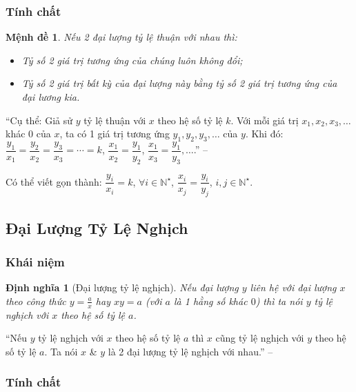 \documentclass{article}
\numberwithin{equation}{section}
\newtheorem{dinhnghia}{Định nghĩa}[section]
\newtheorem{menhde}{Mệnh đề}[section]
\begin{document}
\subsubsection{Tính chất}

\begin{menhde}
	Nếu 2 đại lượng tỷ lệ thuận với nhau thì:
	\begin{itemize}
		\item Tỷ số 2 giá trị tương ứng của chúng luôn không đổi;
		\item Tỷ số 2 giá trị bất kỳ của đại lượng này bằng tỷ số 2 giá trị tương ứng của đại lương kia.
	\end{itemize}
\end{menhde}
``Cụ thể: Giả sử $y$ tỷ lệ thuận với $x$ theo hệ số tỷ lệ $k$. Với mỗi giá trị $x_1,x_2,x_3,\ldots$ khác $0$ của $x$, ta có 1 giá trị tương ứng $y_1,y_2,y_3,\ldots$ của $y$. Khi đó: $\dfrac{y_1}{x_1} = \dfrac{y_2}{x_2} = \dfrac{y_3}{x_3} = \cdots = k$, $\dfrac{x_1}{x_2} = \dfrac{y_1}{y_2}$, $\dfrac{x_1}{x_3} = \dfrac{y_1}{y_3},\ldots$.'' -- \cite[p. 61]{SGK_Toan_7_Canh_Dieu_tap_1}

Có thể viết gọn thành: $\dfrac{y_i}{x_i} = k$, $\forall i\in\mathbb{N}^\star$, $\dfrac{x_i}{x_j} = \dfrac{y_i}{y_j}$, $i,j\in\mathbb{N}^\star$.

\subsection{Đại Lượng Tỷ Lệ Nghịch}

\subsubsection{Khái niệm}

\begin{dinhnghia}[Đại lượng tỷ lệ nghịch]
	Nếu đại lượng $y$ liên hệ với đại lượng $x$ theo công thức $y = \frac{a}{x}$ hay $xy = a$ (với $a$ là 1 hằng số khác $0$) thì ta nói \emph{$y$ tỷ lệ nghịch} với $x$ theo \emph{hệ số tỷ lệ $a$}.
\end{dinhnghia}
``Nếu $y$ tỷ lệ nghịch với $x$ theo hệ số tỷ lệ $a$ thì $x$ cũng tỷ lệ nghịch với $y$ theo hệ số tỷ lệ $a$. Ta nói $x$ \& $y$ là 2 đại lượng tỷ lệ nghịch với nhau.'' -- \cite[p. 64]{SGK_Toan_7_Canh_Dieu_tap_1}

\subsubsection{Tính chất}
\end{document}
